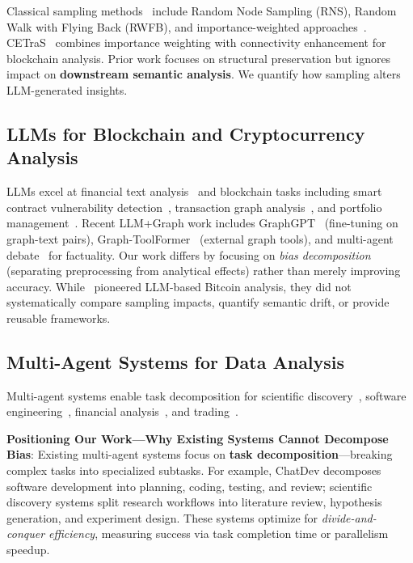 \documentclass[conference]{IEEEtran}
\begin{document}
Classical sampling methods~\cite{leskovec2006sampling} include Random Node Sampling (RNS), Random Walk with Flying Back (RWFB), and importance-weighted approaches~\cite{metropolis1953,ribeiro2010,heckathorn1997}. CETraS~\cite{lei2025llm} combines importance weighting with connectivity enhancement for blockchain analysis. Prior work focuses on structural preservation but ignores impact on \textbf{downstream semantic analysis}. We quantify how sampling alters LLM-generated insights.

\subsection{LLMs for Blockchain and Cryptocurrency Analysis}

LLMs excel at financial text analysis~\cite{zhang2023sentiment,huang2023} and blockchain tasks including smart contract vulnerability detection~\cite{jiao2023,hu2023}, transaction graph analysis~\cite{lei2025llm}, and portfolio management~\cite{chen2024llm,wang2024alphaagent}. Recent LLM+Graph work includes GraphGPT~\cite{graphgpt2024} (fine-tuning on graph-text pairs), Graph-ToolFormer~\cite{graphtoolformer2024} (external graph tools), and multi-agent debate~\cite{du2023debate,liang2023ensemble} for factuality. Our work differs by focusing on \textit{bias decomposition} (separating preprocessing from analytical effects) rather than merely improving accuracy. While~\cite{lei2025llm} pioneered LLM-based Bitcoin analysis, they did not systematically compare sampling impacts, quantify semantic drift, or provide reusable frameworks.

\subsection{Multi-Agent Systems for Data Analysis}

Multi-agent systems enable task decomposition for scientific discovery~\cite{wang2023scientific}, software engineering~\cite{qian2023communicative}, financial analysis~\cite{li2024multiagent}, and trading~\cite{tradinggpt2024}.

\textbf{Positioning Our Work---Why Existing Systems Cannot Decompose Bias}: Existing multi-agent systems focus on \textbf{task decomposition}---breaking complex tasks into specialized subtasks. For example, ChatDev decomposes software development into planning, coding, testing, and review; scientific discovery systems split research workflows into literature review, hypothesis generation, and experiment design. These systems optimize for \textit{divide-and-conquer efficiency}, measuring success via task completion time or parallelism speedup.
\end{document}

